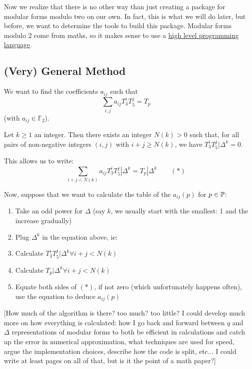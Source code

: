 Now we realize that there is no other way than just creating a package for modular forms modulo two on our own.
In fact, this is what we will do later, but before, we want to determine the tools to build this package.
Modular forms modulo 2 come from maths, so it makes sense to use a \href{https://en.wikipedia.org/wiki/High-level_programming_language}{high level programming language}.



\subsection{(Very) General Method}

We want to find the coefficients $a_{ij}$ such that $$\sum_{i, j} a_{ij} T_3^iT_5^j = T_p$$
(with $a_{ij} \in \mathbb{F}_2$).

Let $k\geq 1$ an integer.
Then there exists an integer $N(k)>0$ such that,
for all pairs of non-negative integers $(i, j)$ with $i+j \geq N(k)$,
we have $T_3^{i}T_5^{j}|\Delta^k = 0$.

This allows us to write:
$$\sum_{i+j < N(k)} a_{ij} T_3^iT_5^j|\Delta^k= T_p|\Delta^k \qquad (*)$$

Now, suppose that we want to calculate the table of the $a_{ij}(p)$ for $p \in \mathbb{P}$:
\begin{enumerate}
    \item Take an odd power for $\Delta$ (say $k$, we usually start with the smallest: 1 and the increase gradually)
    \item Plug $\Delta^k$ in the equation above, ie:
    \item Calculate $T_3^iT_5^j|\Delta^k \forall i+j < N(k)$
    \item Calculate $T_p|\Delta^k \forall i+j < N(k)$
    \item Equate both sides of $(*)$, if not zero (which unfortunately happens often), use the equation to deduce $a_{ij}(p)$
\end{enumerate}

[How much of the algorithm is there? too much? too little? I could develop much more on how everything is calculated: how I go back and forward between $q$ and $\Delta$ representations of modular forms to both be efficient in calculations and catch up the error in numerical approximation, what techniques are used for speed, argue the implementation choices, describe how the code is split, etc... I could write at least  pages on all of that, but is it the point of a math paper?]

